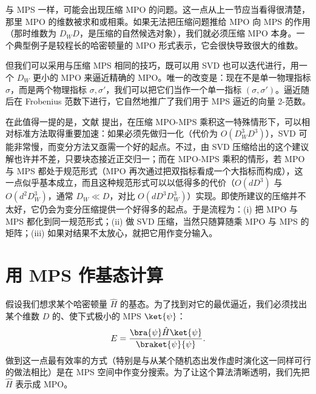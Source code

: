与 MPS 一样，可能会出现压缩 MPO 的问题。这一点从上一节应当看得很清楚，那里 MPO 的维数被求和或相乘。如果无法把压缩问题推给 MPO 向 MPS 的作用（那时维数为 $D_W D$，是压缩的自然候选对象），我们就必须压缩 MPO 本身。一个典型例子是较程长的哈密顿量的 MPO 形式表示，它会很快导致很大的维数。

但我们可以采用与压缩 MPS 相同的技巧，既可以用 SVD 也可以迭代进行，用一个 $D_W$ 更小的 MPO 来逼近精确的 MPO。唯一的改变是：现在不是单一物理指标 $\sigma$，而是两个物理指标 $\sigma,\sigma'$，我们可以把它们当作一个单一指标 $(\sigma,\sigma')$。逼近随后在 Frobenius 范数下进行，它自然地推广了我们用于 MPS 逼近的向量 2-范数。

在此值得一提的是，文献 \cite{Stoudenmire10} 提出，在压缩 MPO-MPS 乘积这一特殊情形下，可以相对标准方法取得重要加速：如果必须先做归一化（代价为 $O(D_W^3 D^3)$），SVD 可能非常慢，而变分方法又亟需一个好的起点。不过，由 SVD 压缩给出的这个建议解也许并不差，只要块态接近正交归一；而在 MPO-MPS 乘积的情形，若 MPO 与 MPS 都处于规范形式（MPO 再次通过把双指标看成一个大指标而构成），这一点似乎基本成立，而且这种规范形式可以以低得多的代价（$O(d D^3)$ 与 $O(d^2 D_W^3)$，通常 $D_W \ll D$，对比 $O(d D^3 D_W^3)$）实现。即使所建议的压缩并不太好，它仍会为变分压缩提供一个好得多的起点。于是流程为：(i) 把 MPO 与 MPS 都化到同一规范形式；(ii) 做 SVD 压缩，当然只随算随乘 MPO 与 MPS 的矩阵；(iii) 如果对结果不太放心，就把它用作变分输入。


 
\section{用 MPS 作基态计算}
\label{sec:groundstates}
假设我们想求某个哈密顿量 $\hat{H}$ 的基态。为了找到对它的最优逼近，我们必须找出某个维数 $D$ 的、使下式极小的 MPS $\ket{\psi}$：
\begin{equation}
E = \frac{\bra{\psi} \hat{H} \ket{\psi}}{\braket{\psi}{\psi}} .
\end{equation} 
做到这一点最有效率的方式（特别是与从某个随机态出发作虚时演化这一同样可行的做法相比）是在 MPS 空间中作变分搜索。为了让这个算法清晰透明，我们先把 $\hat{H}$ 表示成 MPO。

